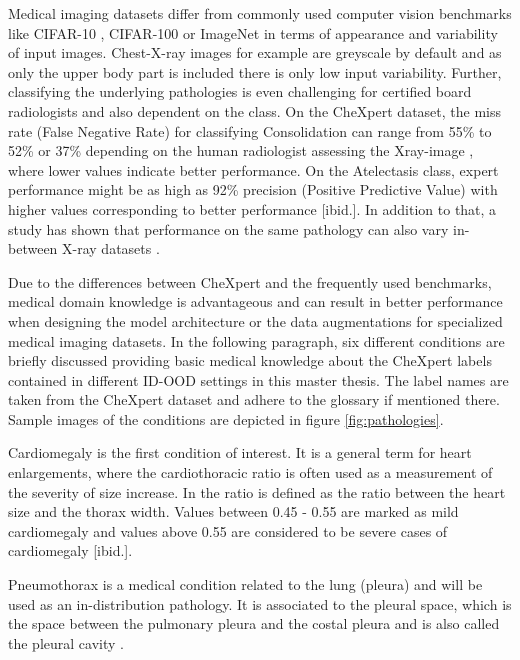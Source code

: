 Medical imaging datasets differ from commonly used computer vision benchmarks like CIFAR-10 \citep{Krizhevsky2009a}, CIFAR-100 \citep{Krizhevsky2009b} or ImageNet \citep{Deng2009} in terms of appearance and variability of input images.
Chest-X-ray images for example are greyscale by default and as only the upper body part is included there is only low input variability.
Further, classifying the underlying pathologies is even challenging for certified board radiologists and also dependent on the class.
On the CheXpert dataset, the miss rate (False Negative Rate) for classifying Consolidation can range from 55\% to 52\% or 37\% depending on the human radiologist assessing the Xray-image \citep{Irvin2019}, where lower values indicate better performance.
On the Atelectasis class, expert performance might be as high as 92\% precision (Positive Predictive Value) with higher values corresponding to better performance [ibid.].
In addition to that, a study has shown that performance on the same pathology can also vary in-between X-ray datasets \textcolor{red}{\citep{Majkowska2020}}.
\par
Due to the differences between CheXpert and the frequently used benchmarks, medical domain knowledge is advantageous and can result in better performance when designing the model architecture or the data augmentations for specialized medical imaging datasets.
In the following paragraph, six different conditions are briefly discussed providing basic medical knowledge about the CheXpert labels contained in different ID-OOD settings in this master thesis.
The label names are taken from the CheXpert dataset \citep{Irvin2019} and adhere to the glossary \citep{Hansell2008} if mentioned there.
Sample images of the conditions are depicted in figure \ref{fig:pathologies}.
\par
Cardiomegaly is the first condition of interest.
It is a general term for heart enlargements, where the cardiothoracic ratio is often used as a measurement of the severity of size increase.
In \citep{Dahnert2011} the ratio is defined as the ratio between the heart size and the thorax width. 
Values between 0.45 - 0.55 are marked as mild cardiomegaly and values above 0.55 are considered to be severe cases of cardiomegaly [ibid.].
\par 
Pneumothorax is a medical condition related to the lung (pleura) and will be used as an in-distribution pathology.
It is associated to the pleural space, which is the space between the pulmonary pleura and the costal pleura and is also called the pleural cavity \citep{Charalampidis2015}.

